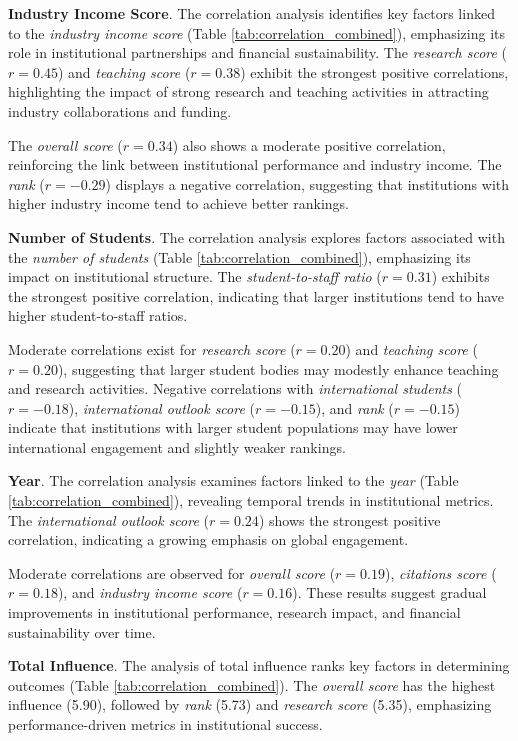 \documentclass[conference]{IEEEtran}
\begin{document}
\textbf{Industry Income Score}. The correlation analysis identifies key factors linked to the \textit{industry income score} (Table \ref{tab:correlation_combined}), emphasizing its role in institutional partnerships and financial sustainability. The \textit{research score} ($r = 0.45$) and \textit{teaching score} ($r = 0.38$) exhibit the strongest positive correlations, highlighting the impact of strong research and teaching activities in attracting industry collaborations and funding.

The \textit{overall score} ($r = 0.34$) also shows a moderate positive correlation, reinforcing the link between institutional performance and industry income. The \textit{rank} ($r = -0.29$) displays a negative correlation, suggesting that institutions with higher industry income tend to achieve better rankings.


\textbf{Number of Students}. The correlation analysis explores factors associated with the \textit{number of students} (Table \ref{tab:correlation_combined}), emphasizing its impact on institutional structure. The \textit{student-to-staff ratio} ($r = 0.31$) exhibits the strongest positive correlation, indicating that larger institutions tend to have higher student-to-staff ratios.

Moderate correlations exist for \textit{research score} ($r = 0.20$) and \textit{teaching score} ($r = 0.20$), suggesting that larger student bodies may modestly enhance teaching and research activities. Negative correlations with \textit{international students} ($r = -0.18$), \textit{international outlook score} ($r = -0.15$), and \textit{rank} ($r = -0.15$) indicate that institutions with larger student populations may have lower international engagement and slightly weaker rankings.



\textbf{Year}. The correlation analysis examines factors linked to the \textit{year} (Table \ref{tab:correlation_combined}), revealing temporal trends in institutional metrics. The \textit{international outlook score} ($r = 0.24$) shows the strongest positive correlation, indicating a growing emphasis on global engagement.

Moderate correlations are observed for \textit{overall score} ($r = 0.19$), \textit{citations score} ($r = 0.18$), and \textit{industry income score} ($r = 0.16$). These results suggest gradual improvements in institutional performance, research impact, and financial sustainability over time.

\textbf{Total Influence}. The analysis of total influence ranks key factors in determining outcomes (Table \ref{tab:correlation_combined}). The \textit{overall score} has the highest influence (5.90), followed by \textit{rank} (5.73) and \textit{research score} (5.35), emphasizing performance-driven metrics in institutional success.
\end{document}

